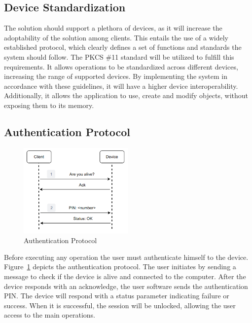 \subsection{Device Standardization}

The solution should support a plethora of devices, as it will increase the adoptability of the solution among clients. This entails the use of a widely established protocol, which clearly defines a set of functions and standards the system should follow.
The \ac{PKCS} \#11 standard will be utilized to fulfill this requirements. It allows operations to be standardized across different devices, increasing the range of supported devices. By implementing the system in accordance with these guidelines, it will have a higher device interoperability. Additionally, it allows the application to use, create and modify objects, without exposing them to its memory.

\subsection{Authentication Protocol}\label{chap:solution:protocol:auth}

\begin{figure}[h]
	\centering
	\includegraphics[width=0.5\textwidth]{./Images/authentication.png}
	\caption{Authentication Protocol}
	\label{fig:protocol:authentication}
\end{figure}

Before executing any operation the user must authenticate himself to the device.
Figure~\ref{fig:protocol:authentication} depicts the authentication protocol.
The user initiates by sending a message to check if the device is alive and connected to the computer. After the device responds with an acknowledge, the user software sends the authentication \ac{PIN}. The device will respond with a status parameter indicating failure or success. When it is successful, the session will be unlocked, allowing the user access to the main operations.

